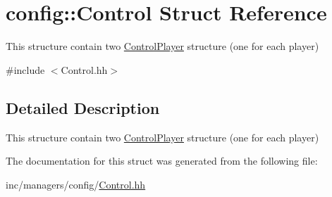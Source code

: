 \hypertarget{structconfig_1_1Control}{}\section{config\+:\+:Control Struct Reference}
\label{structconfig_1_1Control}


This structure contain two \hyperlink{structconfig_1_1ControlPlayer}{Control\+Player} structure (one for each player)  




{\ttfamily \#include $<$Control.\+hh$>$}



\subsection{Detailed Description}
This structure contain two \hyperlink{structconfig_1_1ControlPlayer}{Control\+Player} structure (one for each player) 

The documentation for this struct was generated from the following file\+:\begin{DoxyCompactItemize}
\item 
inc/managers/config/\hyperlink{Control_8hh}{Control.\+hh}\end{DoxyCompactItemize}
